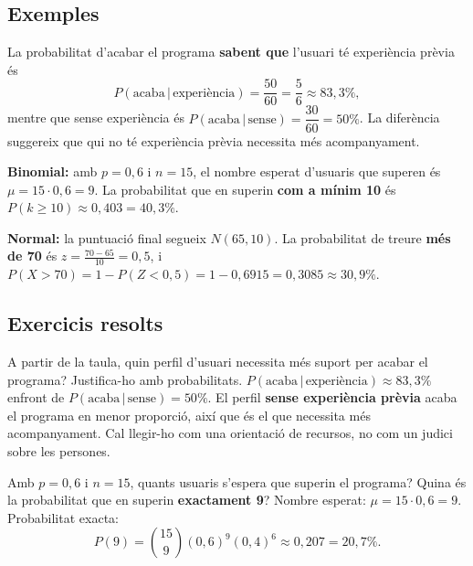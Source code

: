 \subsection{Exemples}

\begin{exemple}
La probabilitat d'acabar el programa \textbf{sabent que} l'usuari té experiència prèvia és
\[
P(\text{acaba}\,|\,\text{experiència})=\frac{50}{60}=\frac{5}{6}\approx 83,3\%,
\]
mentre que sense experiència és $P(\text{acaba}\,|\,\text{sense})=\dfrac{30}{60}=50\%$. La
diferència suggereix que qui no té experiència prèvia necessita més acompanyament.
\end{exemple}

\begin{exemple}
\textbf{Binomial:} amb $p=0,6$ i $n=15$, el nombre esperat d'usuaris que superen és
$\mu=15\cdot 0,6=9$. La probabilitat que en superin \textbf{com a mínim 10} és
$P(k\ge 10)\approx 0,403=40,3\%$.

\smallskip
\noindent\textbf{Normal:} la puntuació final segueix $N(65,10)$. La probabilitat de treure
\textbf{més de 70} és $z=\frac{70-65}{10}=0,5$, i
$P(X>70)=1-P(Z<0,5)=1-0,6915=0,3085\approx 30,9\%$.
\end{exemple}

\subsection{Exercicis resolts}

\begin{exresolt}
A partir de la taula, quin perfil d'usuari necessita més suport per acabar el programa?
Justifica-ho amb probabilitats.
\solucio
$P(\text{acaba}\,|\,\text{experiència})\approx 83,3\%$ enfront de
$P(\text{acaba}\,|\,\text{sense})=50\%$. El perfil \textbf{sense experiència prèvia} acaba
el programa en menor proporció, així que és el que necessita més acompanyament. Cal
llegir-ho com una orientació de recursos, no com un judici sobre les persones.
\end{exresolt}

\begin{exresolt}
Amb $p=0,6$ i $n=15$, quants usuaris s'espera que superin el programa? Quina és la
probabilitat que en superin \textbf{exactament 9}?
\solucio
Nombre esperat: $\mu=15\cdot 0,6=9$. Probabilitat exacta:
\[
P(9)=\binom{15}{9}(0,6)^9(0,4)^6\approx 0,207=20,7\%.
\]
\end{exresolt}

